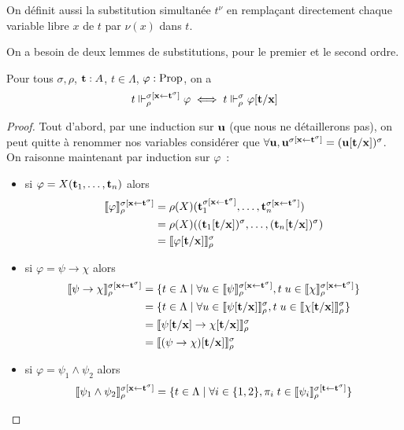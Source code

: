 \documentclass{article}
\begin{document}
On définit aussi la substitution simultanée $t^\nu$ en remplaçant directement chaque variable libre $x$ de $t$ par $\nu(x)$ dans $t$.

On a besoin de deux lemmes de substitutions, pour le premier et le second ordre.

\begin{lem}
  Pour tous $\sigma,\rho$, $\mathbf{t} : A$, $t\in\Lambda$, $\varphi : \mathrm{Prop}$, on a
  \[t\Vdash_\rho^{\sigma[\mathbf{x} \leftarrow \mathbf{t}^\sigma]} \varphi\iff t\Vdash_\rho^\sigma \varphi[\mathbf{t}/\mathbf{x}]\]
\end{lem}

\begin{proof}
  Tout d'abord, par une induction sur $\mathbf{u}$ (que nous ne détaillerons pas), on peut quitte à renommer nos variables considérer que $\forall \mathbf{u}, \mathbf{u}^{\sigma[\mathbf{x}\leftarrow \mathbf{t}^\sigma]} = (\mathbf{u}[\mathbf{t}/\mathbf{x}])^\sigma$. On raisonne maintenant par induction sur $\varphi$~:
  \begin{itemize}
  \item si $\varphi = X(\mathbf{t}_1,\ldots,\mathbf{t}_n)$ alors
    \begin{align*}
      \llbracket \varphi \rrbracket_\rho^{\sigma[\mathbf{x}\leftarrow \mathbf{t}^\sigma]} &= \rho(X)(\mathbf{t}_1^{\sigma[\mathbf{x}\leftarrow \mathbf{t}^\sigma]},\ldots,\mathbf{t}_n^{\sigma[\mathbf{x}\leftarrow \mathbf{t}^\sigma]})\\
      &= \rho(X)((\mathbf{t}_1[\mathbf{t}/\mathbf{x}])^\sigma,\ldots,(\mathbf{t}_n[\mathbf{t}/\mathbf{x}])^\sigma)\\
      &= \llbracket \varphi[\mathbf{t}/\mathbf{x}] \rrbracket_\rho^\sigma
    \end{align*}
  \item si $\varphi = \psi \to \chi$ alors
    \begin{align*}
      \llbracket \psi\to\chi \rrbracket_\rho^{\sigma[\mathbf{x}\leftarrow\mathbf{t}^\sigma]} &= \{t\in\Lambda\mid \forall u\in\llbracket \psi \rrbracket_\rho^{\sigma[\mathbf{x}\leftarrow\mathbf{t}^\sigma]}, t\;u \in \llbracket \chi \rrbracket_\rho^{\sigma[\mathbf{x}\leftarrow\mathbf{t}^\sigma]}\}\\
      &= \{t\in\Lambda\mid\forall u\in \llbracket \psi[\mathbf{t}/\mathbf{x}] \rrbracket_\rho^\sigma, t\;u\in\llbracket \chi[\mathbf{t}/\mathbf{x}] \rrbracket_\rho^\sigma\}\\
      &= \llbracket \psi[\mathbf{t}/\mathbf{x}]\to\chi[\mathbf{t}/\mathbf{x}] \rrbracket_\rho^\sigma\\
      &= \llbracket (\psi\to\chi)[\mathbf{t}/\mathbf{x}] \rrbracket_\rho^\sigma
    \end{align*}
  \item si $\varphi = \psi_1\land \psi_2$ alors
    \begin{align*}
      \trad{\psi_1\land\psi_2}_\rho^{\sigma[\bx\leftarrow\bt^\sigma]} &= \{t\in\Lambda\mid \forall i \in\{1,2\}, \pi_i\;t\in \trad{\psi_i}_\rho^{\sigma[\bt\leftarrow\bt^\sigma]}\}\\

\end{align*}
\end{itemize}
\end{proof}
\end{document}
